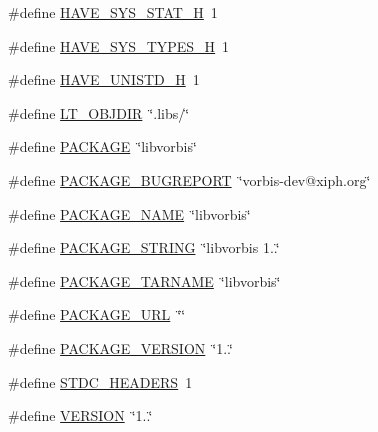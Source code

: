 \begin{DoxyCompactItemize}
\#define \hyperlink{mac_2config_2i386_2lib-src_2libvorbis_2config_8h_ace156430ba007d19b4348a950d0c692b}{H\+A\+V\+E\+\_\+\+S\+Y\+S\+\_\+\+S\+T\+A\+T\+\_\+H}~1
\item 
\#define \hyperlink{mac_2config_2i386_2lib-src_2libvorbis_2config_8h_a69dc70bea5d1f8bd2be9740e974fa666}{H\+A\+V\+E\+\_\+\+S\+Y\+S\+\_\+\+T\+Y\+P\+E\+S\+\_\+H}~1
\item 
\#define \hyperlink{mac_2config_2i386_2lib-src_2libvorbis_2config_8h_a219b06937831d0da94d801ab13987639}{H\+A\+V\+E\+\_\+\+U\+N\+I\+S\+T\+D\+\_\+H}~1
\item 
\#define \hyperlink{mac_2config_2i386_2lib-src_2libvorbis_2config_8h_ac2d5925d76379847dd9fc4747b061659}{L\+T\+\_\+\+O\+B\+J\+D\+IR}~\char`\"{}.libs/\char`\"{}
\item 
\#define \hyperlink{mac_2config_2i386_2lib-src_2libvorbis_2config_8h_aca8570fb706c81df371b7f9bc454ae03}{P\+A\+C\+K\+A\+GE}~\char`\"{}libvorbis\char`\"{}
\item 
\#define \hyperlink{mac_2config_2i386_2lib-src_2libvorbis_2config_8h_a1d1d2d7f8d2f95b376954d649ab03233}{P\+A\+C\+K\+A\+G\+E\+\_\+\+B\+U\+G\+R\+E\+P\+O\+RT}~\char`\"{}vorbis-\/dev@xiph.\+org\char`\"{}
\item 
\#define \hyperlink{mac_2config_2i386_2lib-src_2libvorbis_2config_8h_a1c0439e4355794c09b64274849eb0279}{P\+A\+C\+K\+A\+G\+E\+\_\+\+N\+A\+ME}~\char`\"{}libvorbis\char`\"{}
\item 
\#define \hyperlink{mac_2config_2i386_2lib-src_2libvorbis_2config_8h_ac73e6f903c16eca7710f92e36e1c6fbf}{P\+A\+C\+K\+A\+G\+E\+\_\+\+S\+T\+R\+I\+NG}~\char`\"{}libvorbis 1..\char`\"{}
\item 
\#define \hyperlink{mac_2config_2i386_2lib-src_2libvorbis_2config_8h_af415af6bfede0e8d5453708afe68651c}{P\+A\+C\+K\+A\+G\+E\+\_\+\+T\+A\+R\+N\+A\+ME}~\char`\"{}libvorbis\char`\"{}
\item 
\#define \hyperlink{mac_2config_2i386_2lib-src_2libvorbis_2config_8h_a5c93853116d5a50307b6744f147840aa}{P\+A\+C\+K\+A\+G\+E\+\_\+\+U\+RL}~\char`\"{}\char`\"{}
\item 
\#define \hyperlink{mac_2config_2i386_2lib-src_2libvorbis_2config_8h_aa326a05d5e30f9e9a4bb0b4469d5d0c0}{P\+A\+C\+K\+A\+G\+E\+\_\+\+V\+E\+R\+S\+I\+ON}~\char`\"{}1..\char`\"{}
\item 
\#define \hyperlink{mac_2config_2i386_2lib-src_2libvorbis_2config_8h_a550e5c272cc3cf3814651721167dcd23}{S\+T\+D\+C\+\_\+\+H\+E\+A\+D\+E\+RS}~1
\item 
\#define \hyperlink{mac_2config_2i386_2lib-src_2libvorbis_2config_8h_a1c6d5de492ac61ad29aec7aa9a436bbf}{V\+E\+R\+S\+I\+ON}~\char`\"{}1..\char`\"{}
\end{DoxyCompactItemize}


